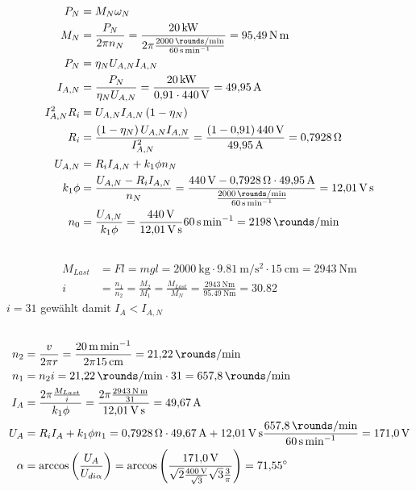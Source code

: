 \documentclass[11pt,a4paper]{scrartcl}
\newcommand{\mybr}[1]{\left(#1\right)}
\newcommand{\0}{_{\mybr{0}}}
\newcommand{\1}{_{\mybr{1}}}
\newcommand{\2}{_{\mybr{2}}}
\begin{document}
\subsection{}
\begin{align}
P_N&=M_N\omega_N\\
M_N&=\frac{P_N}{2\pi n_N}=\frac{\SI{20}{\kilo\watt}}{2\pi \frac{\SI{2000}{\rounds\per\minute}}{\SI{60}{\second\per\minute}}}=\SI{95.49}{\newton\metre}\\
P_N&=\eta_N U_{A,N} I_{A,N}\\
I_{A,N}&=\frac{P_N}{\eta_N U_{A,N}}=\frac{\SI{20}{\kilo\watt}}{\num{0.91}\cdot\SI{440}{\volt}}=\SI{49.95}{\ampere}\\
I_{A,N}^2 R_i&=U_{A,N} I_{A,N}\mybr{1-\eta_N}\\
R_i&=\frac{\mybr{1-\eta_N}U_{A,N}I_{A,N}}{I_{A,N}^2}=\frac{\mybr{1-\num{0.91}}\SI{440}{\volt}}{\SI{49.95}{\ampere}}=\SI{0.7928}{\ohm}\\
U_{A,N}&=R_i I_{A,N}+k_1\phi n_N\\
k_1\phi&=\frac{U_{A,N}-R_i I_{A,N}}{n_N}=\frac{\SI{440}{\volt}-\SI{0.7928}{\ohm}\cdot\SI{49.95}{\ampere}}{\frac{\SI{2000}{\rounds\per\minute}}{\SI{60}{\second\per\minute}}}=\SI{12.01}{\volt\second}\\
n_0&=\frac{U_{A,N}}{k_1\phi}=\frac{\SI{440}{\volt}}{\SI{12.01}{\volt\second}}\SI{60}{\second\per\minute}=\SI{2198}{\rounds\per\minute}
\end{align}

\subsection{}
\begin{align}
M_{Last}&=F l=m g l=\SI{2000}{\kilogram}\cdot\SI{9.81}{\meter\per\second\squared}\cdot\SI{15}{\centi\metre}=\SI{2943}{\newton\metre}\\
i&=\frac{n_1}{n_2}=\frac{M_2}{M_1}=\frac{M_{Last}}{M_N}=\frac{\SI{2943}{\newton\metre}}{\SI{95.49}{\newton\metre}}=\num{30.82}
\end{align}
$i=31$ gewählt damit $I_A < I_{A,N}$

\subsection{}
\begin{align}
n_2&=\frac{v}{2\pi r}=\frac{\SI{20}{\metre\per\minute}}{2\pi\SI{15}{\centi\metre}}=\SI{21.22}{\rounds\per\minute}\\
n_1&=n_2 i =\SI{21.22}{\rounds\per\minute}\cdot 31=\SI{657.8}{\rounds\per\minute}\\
I_A&=\frac{2\pi\frac{M_{Last}}{i}}{k_1\phi}=\frac{2\pi\frac{\SI{2943}{\newton\metre}}{31}}{\SI{12.01}{\volt\second}}=\SI{49.67}{\ampere}\\
U_A&=R_i I_A+k_1\phi n_1=\SI{0.7928}{\ohm}\cdot\SI{49.67}{\ampere}+\SI{12.01}{\volt\second}\frac{\SI{657.8}{\rounds\per\minute}}{\SI{60}{\second\per\minute}}=\SI{171.0}{\volt}\\
\alpha&=\arccos\mybr{\frac{U_A}{U_{di\alpha}}}=\arccos\mybr{\frac{\SI{171.0}{\volt}}{\sqrt{2}\frac{\SI{400}{\volt}}{\sqrt{3}}\sqrt{3}\frac{3}{\pi}}}=\SI{71.55}{\degree}
\end{align}
\end{document}
